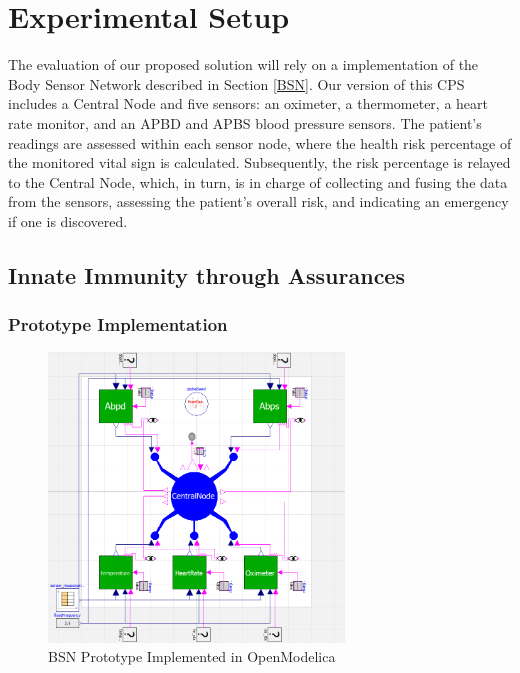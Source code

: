 \section{Experimental Setup}

The evaluation of our proposed solution will rely on a implementation of the Body Sensor Network described in Section \ref{BSN}. Our version of this CPS includes a Central Node and five sensors: an oximeter, a thermometer, a heart rate monitor, and an APBD and APBS blood pressure sensors. The patient's readings are assessed within each sensor node, where the health risk percentage of the monitored vital sign is calculated. Subsequently, the risk percentage is relayed to the Central Node, which, in turn, is in charge of collecting and fusing the data from the sensors, assessing the patient's overall risk, and indicating an emergency if one is discovered.

\subsection{Innate Immunity through Assurances}

\subsubsection{Prototype Implementation}

\begin{figure}[!h]
	\centering
	\includegraphics[width=0.7\textwidth, keepaspectratio]{img/BSN_prototype_Modelica.png}
	\caption{BSN Prototype Implemented in OpenModelica}
	\label{fig:BsnProt}
\end{figure}

